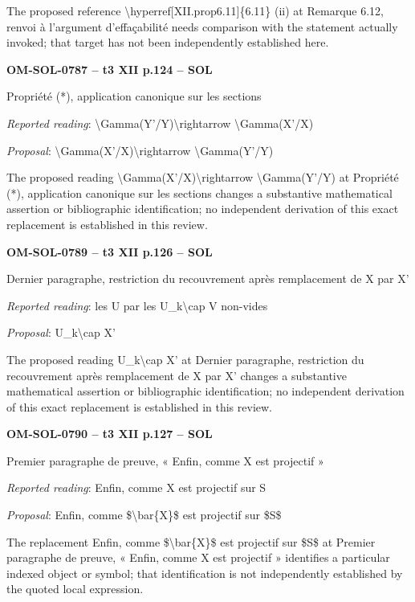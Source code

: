 The proposed reference \textbackslash{}hyperref[XII.prop6.11]\{6.11\} (ii) at Remarque 6.12, renvoi à l'argument d'effaçabilité needs comparison with the statement actually invoked; that target has not been independently established here.\par
\par\noindent\textbf{OM-SOL-0787 -- t3 XII p.124 -- SOL}\par
Propriété (*), application canonique sur les sections\par
\emph{Reported reading}: \textbackslash{}Gamma(Y'/Y)\textbackslash{}rightarrow \textbackslash{}Gamma(X'/X)\par
\emph{Proposal}: \textbackslash{}Gamma(X'/X)\textbackslash{}rightarrow \textbackslash{}Gamma(Y'/Y)\par
The proposed reading \textbackslash{}Gamma(X'/X)\textbackslash{}rightarrow \textbackslash{}Gamma(Y'/Y) at Propriété (*), application canonique sur les sections changes a substantive mathematical assertion or bibliographic identification; no independent derivation of this exact replacement is established in this review.\par
\par\noindent\textbf{OM-SOL-0789 -- t3 XII p.126 -- SOL}\par
Dernier paragraphe, restriction du recouvrement après remplacement de X par X'\par
\emph{Reported reading}: les U par les U\_k\textbackslash{}cap V non-vides\par
\emph{Proposal}: U\_k\textbackslash{}cap X'\par
The proposed reading U\_k\textbackslash{}cap X' at Dernier paragraphe, restriction du recouvrement après remplacement de X par X' changes a substantive mathematical assertion or bibliographic identification; no independent derivation of this exact replacement is established in this review.\par
\par\noindent\textbf{OM-SOL-0790 -- t3 XII p.127 -- SOL}\par
Premier paragraphe de preuve, « Enfin, comme X est projectif »\par
\emph{Reported reading}: Enfin, comme X est projectif sur S\par
\emph{Proposal}: Enfin, comme \$\textbackslash{}bar\{X\}\$ est projectif sur \$S\$\par
The replacement Enfin, comme \$\textbackslash{}bar\{X\}\$ est projectif sur \$S\$ at Premier paragraphe de preuve, « Enfin, comme X est projectif » identifies a particular indexed object or symbol; that identification is not independently established by the quoted local expression.\par
